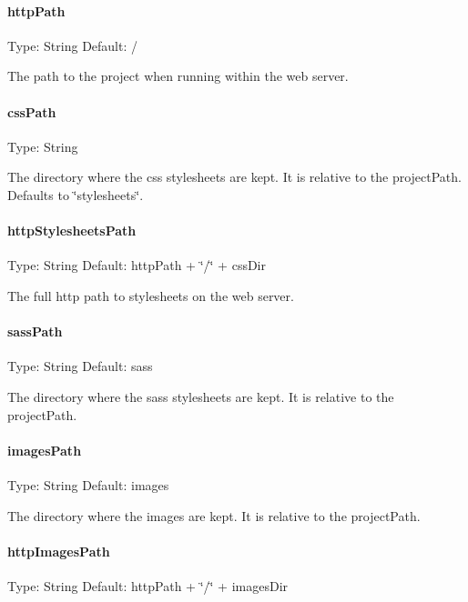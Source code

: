 \paragraph*{http\+Path}

Type\+: {\ttfamily String} Default\+: {\ttfamily /}

The path to the project when running within the web server.

\paragraph*{css\+Path}

Type\+: {\ttfamily String}

The directory where the css stylesheets are kept. It is relative to the {\ttfamily project\+Path}. Defaults to \char`\"{}stylesheets\char`\"{}.

\paragraph*{http\+Stylesheets\+Path}

Type\+: {\ttfamily String} Default\+: {\ttfamily http\+Path + \char`\"{}/\char`\"{} + css\+Dir}

The full http path to stylesheets on the web server.

\paragraph*{sass\+Path}

Type\+: {\ttfamily String} Default\+: {\ttfamily sass}

The directory where the sass stylesheets are kept. It is relative to the {\ttfamily project\+Path}.

\paragraph*{images\+Path}

Type\+: {\ttfamily String} Default\+: {\ttfamily images}

The directory where the images are kept. It is relative to the project\+Path.

\paragraph*{http\+Images\+Path}

Type\+: {\ttfamily String} Default\+: {\ttfamily http\+Path + \char`\"{}/\char`\"{} + images\+Dir}

